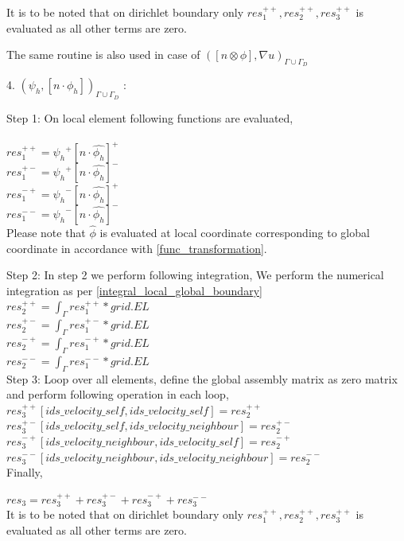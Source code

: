 \documentclass[a4paper,10pt]{book}
\begin{document}
It is to be noted that on dirichlet boundary only $res_1^{++}, res_2^{++}, res_3^{++}$ is evaluated as all other terms are zero.

The same routine is also used in case of $([n \otimes \phi],{\nabla u})_{\Gamma \cup \Gamma_D}$

4. $({\psi_h}, [n \cdot \phi_h])_{\Gamma \cup \Gamma_D}$ :

Step 1: On local element following functions are evaluated,\\
\\
$res_1^{++} = {\psi_h}^+ [n \cdot \hat{\phi_h}]^+$\\
$res_1^{+-} = {\psi_h}^+ [n \cdot \hat{\phi_h}]^-$\\
$res_1^{-+} = {\psi_h}^- [n \cdot \hat{\phi_h}]^+$\\
$res_1^{--} = {\psi_h}^- [n \cdot \hat{\phi_h}]^-$\\

Please note that $\hat{\phi}$ is evaluated at local coordinate corresponding to global coordinate in accordance with \ref{func_transformation}.

Step 2: In step 2 we perform following integration, 
We perform the numerical integration as per \ref{integral_local_global_boundary}
\\ 
$res_2^{++} = \int_{\Gamma} res_1^{++} * grid.EL$\\
$res_2^{+-} = \int_{\Gamma} res_1^{+-} * grid.EL$\\
$res_2^{-+} = \int_{\Gamma} res_1^{-+} * grid.EL$\\
$res_2^{--} = \int_{\Gamma} res_1^{--} * grid.EL$\\

Step 3: Loop over all elements, define the global assembly matrix as zero matrix and perform following operation in each loop,
\\
$res_3^{++}[ids\_velocity\_self,ids\_velocity\_self] = res_2^{++}$\\
$res_3^{+-}[ids\_velocity\_self,ids\_velocity\_neighbour] = res_2^{+-}$\\
$res_3^{-+}[ids\_velocity\_neighbour,ids\_velocity\_self] = res_2^{-+}$\\
$res_3^{--}[ids\_velocity\_neighbour,ids\_velocity\_neighbour] = res_2^{--}$\\

Finally,

$res_3 = res_3^{++} + res_3^{+-} + res_3^{-+} + res_3^{--}$\\

It is to be noted that on dirichlet boundary only $res_1^{++}, res_2^{++}, res_3^{++}$ is evaluated as all other terms are zero.
\end{document}
